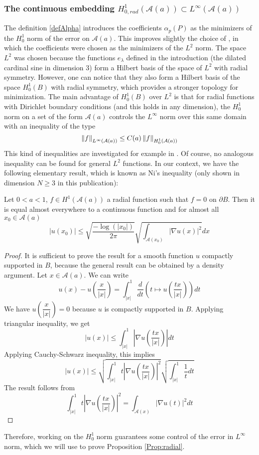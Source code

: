 \documentclass[11pt,a4paper]{article}
\begin{document}
\subsubsection{The continuous embedding $H^1_{0,rad}(\mathcal{A}(a)) \subset L^{\infty}(\mathcal{A}(a))$}

The definition \ref{defAlpha} introduces the coefficients $\alpha_p(P)$ as the minimizers of the $H^1_0$ norm of the error on $\mathcal{A}(a)$. This improves slightly the choice of \cite{Alouges2015}, in which the coefficients were chosen as the minimizers of the $L^2$ norm. The space $L^2$ was chosen because the functions $e_\lambda$ defined in the introduction (the dilated cardinal sine in dimension 3) form a Hilbert basis of the space of $L^2$ with radial symmetry. However, one can notice that they also form a Hilbert basis of the space $H^1_0(B)$ with radial symmetry, which provides a stronger topology for minimization. The main advantage of $H^1_0(B)$ over $L^2$ is that for radial functions with Dirichlet boundary conditions (and this holds in any dimension), the $H^1_0$ norm on a set of the form $\mathcal{A}(a)$ controls the $L^\infty$ norm over this same domain with an inequality of the type 
\begin{equation}
\left\|f\right\|_{L^\infty(\mathcal{A}(a))} \leq C(a) \left\|f\right\|_{H^1_0(\mathcal{A}(a))}
\label{ControleH1LinfGenerique}
\end{equation}
This kind of inequalities are investigated for example in \cite{de2016elementary}.
Of course, no analogous inequality can be found for general $L^2$ functions. 
In our context, we have the following elementary result, which is known as Ni's inequality \cite{Ni} (only shown in dimension $N \geq 3$ in this publication): 
\begin{Prop} \label{ControleH1Linf} Let $0< a <   1$, $f \in H^1(\mathcal{A}(a))$ a radial function such that $f = 0$ on $\partial B$. Then it is equal almost everywhere to a continuous function and for almost all $ x_0 \in \mathcal{A}(a)$
\[ \left|u(x_0)\right| \leq \sqrt{\dfrac{-\log(|x_0|)}{2\pi}} \sqrt{\int_{\mathcal{A}(x_0)}| \nabla u(x)|^2 } dx\]
\begin{proof}
It is sufficient to prove the result for a smooth function $u$ compactly supported in $B$, because the general result can be obtained by a density argument. Let $x \in \mathcal{A}(a)$. We can write 
\[u(x) - u\left(\dfrac{x}{|x|}\right) = \int_{|x|}^1 \dfrac{d}{dt}\left(t \mapsto u\left(\frac{tx}{|x|}\right)\right)dt\]
We have $u\left(\dfrac{x}{|x|}\right) = 0$ because $u$ is compactly supported in $B$. Applying triangular inequality, we get 
\[\left|u(x)\right| \leq \int_{|x|}^1 \left|\nabla u\left(\frac{tx}{|x|}\right)\right| dt\]
Applying Cauchy-Schwarz inequality, this implies 
\[|u(x)| \leq \sqrt{\int_{|x|}^1 t \left|\nabla u\left(\frac{tx}{|x|}\right)\right|^2 } \sqrt{\int_{|x|}^1 \dfrac{1}{t}dt}\]
The result follows from 
\[ \int_{|x|}^1 t \left|\nabla u\left(\frac{tx}{|x|}\right)\right|^2 = \int_{\mathcal{A}(x)} |\nabla u(t)|^2 dt\]
\end{proof}
\end{Prop}
Therefore, working on the $H^1_0$ norm guarantees some control of the error in $L^\infty$ norm, which we will use to prove Proposition \ref{Prop:radial}.
\end{document}
